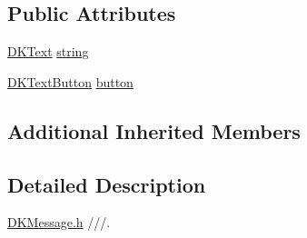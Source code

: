 \subsection*{Public Attributes}
\begin{DoxyCompactItemize}
\item 
\hyperlink{class_d_k_text}{D\-K\-Text} \hyperlink{class_d_k_message_a16744276ca1bfffa00b31703d564c91a}{string}
\item 
\hyperlink{class_d_k_text_button}{D\-K\-Text\-Button} \hyperlink{class_d_k_message_a8191a96699ef2813242b909273da7786}{button}
\end{DoxyCompactItemize}
\subsection*{Additional Inherited Members}


\subsection{Detailed Description}
\hyperlink{_d_k_message_8h}{D\-K\-Message.\-h} ///. 

